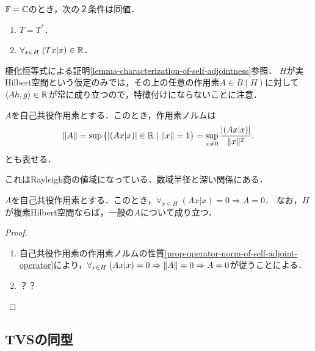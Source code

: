 \documentclass[uplatex,dvipdfmx]{jsreport}
\begin{document}
\begin{corollary}[自己共役作用素の特徴付け]\label{cor-characterization-of-self-adjointness}
    $\mathbb{F}=\mathbb{C}$のとき，次の２条件は同値．
    \begin{enumerate}
        \item $T=T^*$．
        \item $\forall_{x\in H}\;(Tx|x)\in\mathbb{R}$．
    \end{enumerate}
\end{corollary}
\begin{remark}[自己共役作用素の固有値は実数]
    極化恒等式による証明\ref{lemma-characterization-of-self-adjointness}参照．
    $H$が実Hilbert空間という仮定のみでは，その上の任意の作用素$A\in B(H)$に対して$\langle Ah,g\rangle\in\mathbb{R}$が常に成り立つので，特徴付けにならないことに注意．
\end{remark}

\begin{proposition}[自己共役作用素の作用素ノルム]\label{prop-operator-norm-of-self-adjoint-operator}
    $A$を自己共役作用素とする．このとき，作用素ノルムは
    \[\|A\|=\sup\left\{\lvert(Ax|x)\rvert\in\mathbb{R}\mid\|x\|=1\right\}=\sup_{x\ne0}\frac{\lvert(Ax|x)\rvert}{\|x\|^2}.\]
    とも表せる．
\end{proposition}
\begin{remarks}[数域]
    これはRayleigh商の値域になっている．数域半径と深い関係にある．
\end{remarks}

\begin{corollary}[半内積の非退化性]\label{cor-nondegeneratedness-of-semi-inner-product}
    $A$を自己共役作用素とする．このとき，$\forall_{x\in H}\;(Ax|x)=0\Rightarrow A=0$．
    なお，$H$が複素Hilbert空間ならば，一般の$A$について成り立つ．
\end{corollary}
\begin{proof}\mbox{}
    \begin{enumerate}
        \item 自己共役作用素の作用素ノルムの性質\ref{prop-operator-norm-of-self-adjoint-operator}により，$\forall_{x\in H}\;(Ax|x)=0\Rightarrow\|A\|=0\Rightarrow A=0$が従うことによる．
        \item ？？
    \end{enumerate}
\end{proof}

\subsection{TVSの同型}
\end{document}

